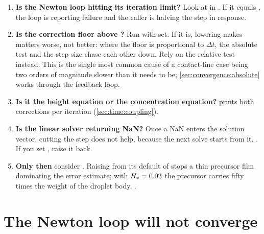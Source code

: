 \begin{enumerate}
  \item \textbf{Is the Newton loop hitting its iteration limit?} Look at
     in . If it equals , the
    loop is reporting failure and the caller is halving the step in response.
  \item \textbf{Is the correction floor above ?} Run with
     set. If it is, lowering  makes
    matters worse, not better: where the floor is proportional to $\Delta t$,
    the absolute test and the step size chase each other down. Rely on the relative
    test  instead. This is the single most common cause of a
    contact-line case being two orders of magnitude slower than it needs to be;
    \cref{sec:convergence:absolute} works through the feedback loop.
  \item \textbf{Is it the height equation or the concentration equation?}
     prints both corrections per iteration
    (\cref{sec:time:coupling}).
  \item \textbf{Is the linear solver returning NaN?} Once a NaN enters the
    solution vector, cutting the step does not help, because the next solve
    starts from it. . If you set
    , raise it back.
  \item \textbf{Only then} consider . Raising
     from its default of  stops a thin precursor film
    dominating the error estimate; with $H_{*} = 0.02$ the precursor carries
    fifty times the weight of the droplet body. .
\end{enumerate}

\section{The Newton loop will not converge}
\label{sec:trouble:newton}

